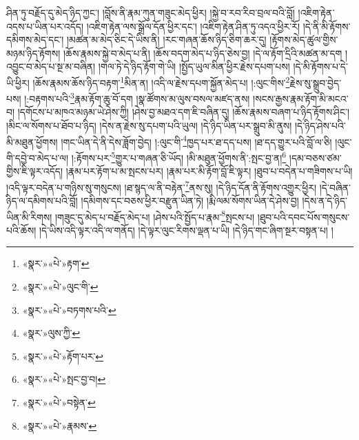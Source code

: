 ཤིན་ཏུ་བརྗོད་དུ་མེད་ཉིད་ཀྱང་། །བློས་ནི་རྣམ་ཀུན་གཟུང་མེད་ཕྱིར། །སྐྱེ་བ་རབ་རིབ་བྲལ་བའི་བློ། །འཇིག་རྟེན་འདས་པ་ཡིན་པར་འདོད། །འཇིག་རྟེན་ལས་སྒྲོལ་དོན་ཕྱིར་དང་། །འཇིག་རྟེན་ཤིན་ཏུ་འདའ་ཕྱིར་རོ། །དེ་ནི་མི་རྟོགས་དམིགས་མེད་དང་། །མཚན་མ་མེད་ཅིང་དེ་ཡིས་ནི། །རང་གཞན་ཆོས་ཉིད་ཅིག་ཆར་དུ། །རྟོགས་མེད་ཚུལ་གྱིས་མཉམ་ཉིད་རྟོགས། །ཆོས་རྣམས་སྐྱེ་བ་མེད་པ་ནི། །ཆོས་བདག་མེད་པ་ཉིད་ཅེས་བྱ། །དེ་ལ་རྟོག་དྲིའི་མཚན་མ་དག །འབྱུང་བ་མེད་པ་སྔ་མ་བཞིན། །གལ་ཏེ་དེ་ཉིད་རྟོག་གེ་ཡི། །སྤྱོད་ཡུལ་མིན་ཕྱིར་རྗེས་དཔག་པས། །དེ་མི་རྟོགས་པ་དེ་ཡི་ཕྱིར། །ཆོས་རྣམས་ཆོས་ཉིད་བརྟག་\footnote{«སྣར་»«པེ་»རྟག་}མིན་ན། །འདི་ལ་རྗེས་དཔག་སྐྱོན་མེད་པ། །:ལུང་གིས་\footnote{«སྣར་»«པེ་»ལུང་གི་}རྗེས་སུ་སྒྲུབ་བྱེད་པས། །:བརྟགས་པའི་\footnote{«སྣར་»«པེ་»བཏགས་པའི་}རྣམ་རྟོག་ཆུ་བོ་དག །སྣ་ཚོགས་མ་ལུས་བསལ་མཛད་ནས། །སངས་རྒྱས་རྣམ་རྟོག་མི་མངའ་བ། །དགོངས་པ་མཁའ་མཉམ་ཡེ་ཤེས་ཀྱི། །ཤེས་བྱ་མཐའ་དག་ཇི་བཞིན་དུ། །ཆོས་རྣམས་བཞག་པ་ཉིད་རྟོགས་ཤིང་། །མིང་ལ་སོགས་པ་ཐོབ་པ་ཉིད། །དེས་ན་རྗེས་སུ་དཔག་པའི་ཡུལ། །དེ་ཉིད་ཡིན་པར་སྒྲུབ་མི་ནུས། །དེ་ཉིད་ཤེས་པའི་མི་མཐུན་ཕྱོགས། །གང་ཡིན་དེ་ནི་དེས་ཟློག་བྱེད། །:ལུང་གི་\footnote{«སྣར་»ལུས་ཀྱི་}ཁྱད་པར་ཐ་དད་པས། །ཐ་དད་གྱུར་པའི་བློ་ལ་ཅི། །ལུང་གི་དབྱེ་བ་མེད་པ་ལ། །:རྟོགས་པར་\footnote{«སྣར་»«པེ་»རྟོག་པར་}གྱུར་པ་གཞན་ཅི་ཡོད། །མི་མཐུན་ཕྱོགས་ནི་:སྤང་བྱ་ན།\footnote{«སྣར་»«པེ་»སྤང་བྱ་བ།} །དམ་བཅས་ཙམ་གྱིས་ཇི་ལྟར་འདོད། །རྣམ་པར་རྟོག་པ་མ་སྤངས་པར། །རྣམ་པར་མི་རྟོག་བློ་ཇི་ལྟར། །ཐུབ་པ་བདེན་པ་གཟིགས་པ་ཡི། །འདི་ལྟར་བདེན་པ་གཉིས་སུ་གསུངས། །ཐ་སྙད་ལ་ནི་བརྟེན་\footnote{«སྣར་»«པེ་»བསྟེན་}ནས་སུ། །དེ་ཉིད་དོན་ནི་རྟོགས་འགྱུར་ཕྱིར། །དེ་བཞིན་ཉིད་ལ་དམིགས་པའི་བློ། །དམིགས་དང་བཅས་ཕྱིར་བརྫུན་ཡིན་ཏེ། །རྨི་ལམ་སོགས་ཡིན་དེ་ཤེས་བྱ། །དེས་ན་དེ་ཉིད་ཡིན་མི་རིགས། །གཟུང་དུ་མེད་པ་བརྗོད་མེད་པ། །ཤེས་པའི་སྤྱོད་པ་རྣམ་\footnote{«སྣར་»«པེ་»རྣམས་}སྤངས་པ། །ཐུབ་པའི་དབང་པོས་གསུངས་པའི་ཆོས། །དེ་ཡིས་འདི་ལྟར་འདི་ལ་གནོད། །དེ་ལྟར་ལུང་རིགས་ལྡན་པ་ཡི། །དེ་ཉིད་གང་ཞིག་སྔར་བསྟན་པ། །
